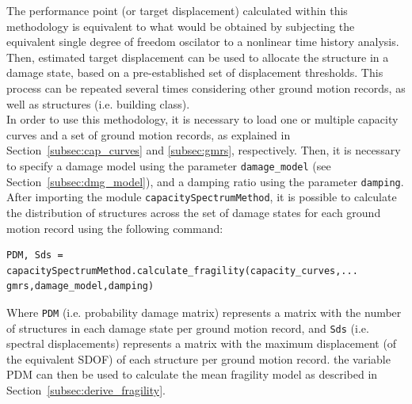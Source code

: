 The performance point (or target displacement) calculated within this methodology is equivalent to what would be obtained by subjecting the equivalent single degree of freedom oscilator to a nonlinear time history analysis. Then, estimated target displacement can be used to allocate the structure in a damage state, based on a pre-established set of displacement thresholds. This process can be repeated several times considering other ground motion records, as well as structures (i.e. building class).\\

In order to use this methodology, it is necessary to load one or multiple capacity curves and a set of ground motion records, as explained in Section~\ref{subsec:cap_curves} and \ref{subsec:gmrs}, respectively. Then, it is necessary to specify a damage model using the parameter \verb=damage_model= (see Section~\ref{subsec:dmg_model}), and a damping ratio using the parameter \verb=damping=. After importing the module \verb=capacitySpectrumMethod=, it is possible to calculate the distribution of structures across the set of damage states for each ground motion record using the following command:

\begin{Verbatim}[frame=single, commandchars=\\\{\}, samepage=true]
PDM, Sds = capacitySpectrumMethod.calculate_fragility(capacity_curves,...
gmrs,damage_model,damping)
\end{Verbatim}

Where \verb=PDM= (i.e. probability damage matrix) represents a matrix with the number of structures in each damage state per ground motion record, and \verb=Sds= (i.e. spectral displacements) represents a matrix with the maximum displacement (of the equivalent SDOF) of each structure per ground motion record. the variable PDM can then be used to calculate the mean fragility model as described in Section~\ref{subsec:derive_fragility}.



